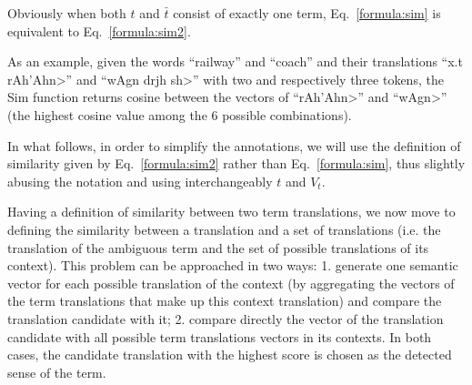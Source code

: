 Obviously when both $t$ and $\bar{t}$ consist of exactly one term, Eq.~\ref{formula:sim} is equivalent to Eq.~\ref{formula:sim2}.



As an example, given the words ``railway'' and ``coach'' and their translations ``\<x.t rAh\hspace{0ex}'Ahn>'' and ``\<wAgn drjh sh>''  with two and respectively three tokens, the Sim function returns cosine between the vectors of ``\<rAh\hspace{0ex}'Ahn>'' and ``\<wAgn>'' (the highest cosine value among the 6 possible combinations). 

In what follows, in order to simplify the annotations, we will use the definition of similarity given by Eq.~\ref{formula:sim2} rather than Eq.~\ref{formula:sim}, thus slightly abusing the notation and using interchangeably $t$ and $V_t$. 


Having a definition of similarity between two term translations, we now move to defining the similarity between a translation and a set of translations (i.e. the translation of the ambiguous term and the set of possible translations of its context). 
This problem can be approached in two ways: %
1. generate one semantic vector for each possible translation of the context (by aggregating the vectors of the term translations that make up this context translation) and compare the translation candidate with it; 2. compare directly the vector of the translation candidate  with all possible term translations vectors in its contexts. In both cases, the candidate translation with the highest score is chosen as the detected sense of the term.

